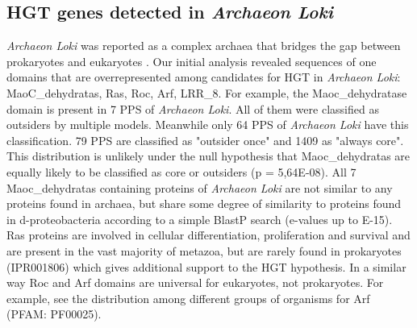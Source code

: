 \subsection{HGT genes detected in \textit{Archaeon Loki}} \textit{Archaeon
Loki} was reported as a complex archaea that bridges the gap between
prokaryotes and eukaryotes \cite{Spang2015}. Our initial analysis revealed
sequences of one domains that are overrepresented among candidates for HGT in
\textit{Archaeon Loki}: MaoC\_dehydratas, Ras, Roc, Arf, LRR\_8. For example,
the Maoc\_dehydratase domain is present in 7 PPS of \textit{Archaeon Loki}. All
of them were classified as outsiders by multiple models. Meanwhile only 64 PPS
of \textit{Archaeon Loki} have this classification. 79 PPS are classified as
"outsider once" and 1409 as "always core". This distribution is unlikely under
the null hypothesis that Maoc\_dehydratas are equally likely to be classified
as core or outsiders (p = 5,64E-08). All 7 Maoc\_dehydratas containing proteins
of \textit{Archaeon Loki} are not similar to any proteins found in archaea, but
share some degree of similarity to proteins found in d-proteobacteria according
to a simple BlastP search (e-values up to E-15).  Ras proteins are involved in
cellular differentiation, proliferation and survival and are present in the
vast majority of metazoa, but are rarely found in prokaryotes (IPR001806) which
gives additional support to the HGT hypothesis. In a similar way Roc and Arf
domains are universal for eukaryotes, not prokaryotes. For example, see the
distribution among different groups of organisms for Arf (PFAM: PF00025).

